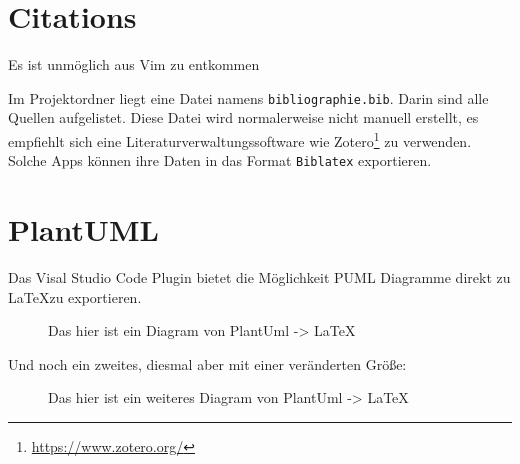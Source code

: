 \section{Citations}
Es ist unmöglich aus Vim zu entkommen \cite{nerd_how_2012}

Im Projektordner liegt eine Datei namens \texttt{bibliographie.bib}. Darin sind alle Quellen aufgelistet. Diese Datei wird normalerweise nicht manuell erstellt, es empfiehlt sich eine Literaturverwaltungssoftware wie Zotero\footnote{\url{https://www.zotero.org/}} zu verwenden. Solche Apps können ihre Daten in das Format \texttt{Biblatex} exportieren.

\section{PlantUML}
Das Visal Studio Code Plugin bietet die Möglichkeit PUML Diagramme direkt zu \LaTeX zu exportieren.

\begin{figure}[H]
    \centering
    
    \caption{Das hier ist ein Diagram von PlantUml -> \LaTeX}
\end{figure}

Und noch ein zweites, diesmal aber mit einer veränderten Größe:
\begin{figure}[H]
    \centering
    \resizebox{10cm}{!}{
        
    }
    \caption{Das hier ist ein weiteres Diagram von PlantUml -> \LaTeX}
\end{figure}
